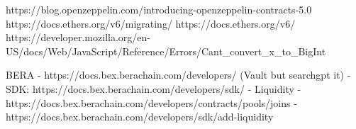 https://blog.openzeppelin.com/introducing-openzeppelin-contracts-5.0 
https://docs.ethers.org/v6/migrating/
    https://docs.ethers.org/v6/
    https://developer.mozilla.org/en-US/docs/Web/JavaScript/Reference/Errors/Cant_convert_x_to_BigInt 


BERA
    - https://docs.bex.berachain.com/developers/ (Vault but searchgpt it)
    - SDK: https://docs.bex.berachain.com/developers/sdk/
    - Liquidity 
        - https://docs.bex.berachain.com/developers/contracts/pools/joins
        - https://docs.bex.berachain.com/developers/sdk/add-liquidity
